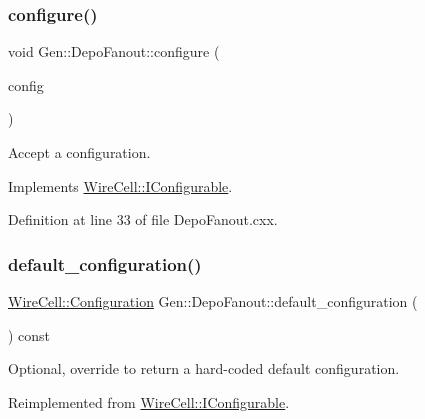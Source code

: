 \subsubsection{\texorpdfstring{configure()}{configure()}}
{\footnotesize\ttfamily void Gen\+::\+Depo\+Fanout\+::configure (\begin{DoxyParamCaption}\item[{const \hyperlink{namespace_wire_cell_a9f705541fc1d46c608b3d32c182333ee}{Wire\+Cell\+::\+Configuration} \&}]{config }\end{DoxyParamCaption})\hspace{0.3cm}{\ttfamily [virtual]}}



Accept a configuration. 



Implements \hyperlink{class_wire_cell_1_1_i_configurable_a57ff687923a724093df3de59c6ff237d}{Wire\+Cell\+::\+I\+Configurable}.



Definition at line 33 of file Depo\+Fanout.\+cxx.

\mbox{\label{class_wire_cell_1_1_gen_1_1_depo_fanout_a23fa2c3ca19bd83d37254fa0fd085f8c}} 
\subsubsection{\texorpdfstring{default\+\_\+configuration()}{default\_configuration()}}
{\footnotesize\ttfamily \hyperlink{namespace_wire_cell_a9f705541fc1d46c608b3d32c182333ee}{Wire\+Cell\+::\+Configuration} Gen\+::\+Depo\+Fanout\+::default\+\_\+configuration (\begin{DoxyParamCaption}{ }\end{DoxyParamCaption}) const\hspace{0.3cm}{\ttfamily [virtual]}}



Optional, override to return a hard-\/coded default configuration. 



Reimplemented from \hyperlink{class_wire_cell_1_1_i_configurable_a54841b2da3d1ea02189478bff96f7998}{Wire\+Cell\+::\+I\+Configurable}.



